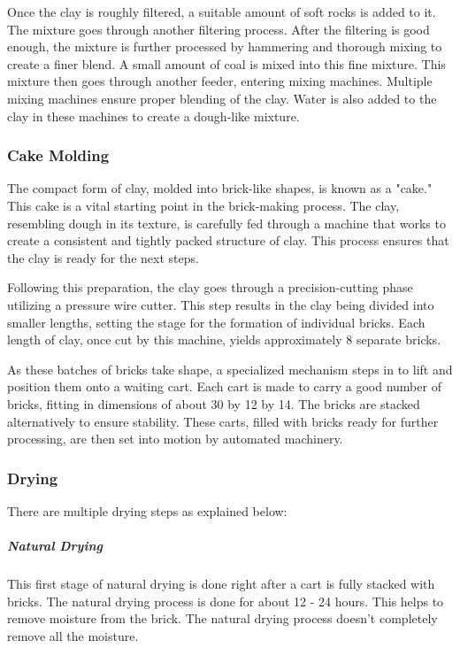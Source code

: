 Once the clay is roughly filtered, a suitable amount of soft rocks is added to it. The mixture goes through another filtering process. After the filtering is good enough, the mixture is further processed by hammering and thorough mixing to create a finer blend. A small amount of coal is mixed into this fine mixture. This mixture then goes through another feeder, entering mixing machines. Multiple mixing machines ensure proper blending of the clay. Water is also added to the clay in these machines to create a dough-like mixture.

\subsubsection{Cake Molding}
The compact form of clay, molded into brick-like shapes, is known as a "cake." This cake is a vital starting point in the brick-making process. The clay, resembling dough in its texture, is carefully fed through a machine that works to create a consistent and tightly packed structure of clay. This process ensures that the clay is ready for the next steps.

Following this preparation, the clay goes through a precision-cutting phase utilizing a pressure wire cutter. This step results in the clay being divided into smaller lengths, setting the stage for the formation of individual bricks. Each length of clay, once cut by this machine, yields approximately 8 separate bricks.

As these batches of bricks take shape, a specialized mechanism steps in to lift and position them onto a waiting cart. Each cart is made to carry a good number of bricks, fitting in dimensions of about 30 by 12 by 14. The bricks are stacked alternatively to ensure stability. These carts, filled with bricks ready for further processing, are then set into motion by automated machinery.

\subsubsection{Drying}
There are multiple drying steps as explained below:
\subparagraph{Natural Drying}
\begin{adjustwidth}{1.5em}{0em}
\vspace{0.1cm}
  This first stage of natural drying is done right after a cart is fully stacked with bricks. The natural drying process is done for about 12 - 24 hours. This helps to remove moisture from the brick. The natural drying process doesn't completely remove all the moisture.
\end{adjustwidth}



